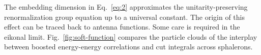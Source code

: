 The embedding dimension in Eq.~\eqref{eq:2} approximates the
unitarity-preserving renormalization group equation up to a universal
constant. The origin of this effect can be traced back to antenna
functions. Some care is required in the eikonal limit.
Fig.~\ref{fig:soft-function} compares the particle clouds of the
interplay between boosted energy-energy correlations and cut integrals
across sphalerons.

